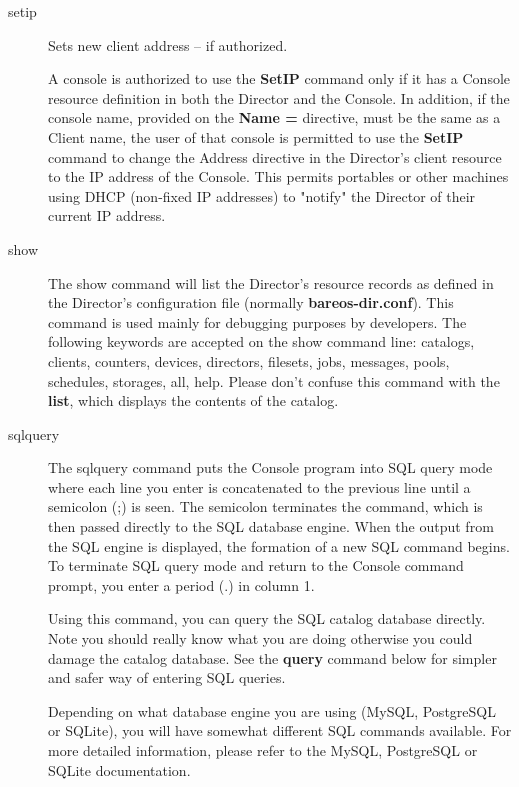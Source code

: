 \begin{description}
\item [setip]
   Sets new client address -- if authorized.

   A console is authorized to use the {\bf SetIP} command only if it has a
   Console resource definition in both the Director and the Console.  In
   addition, if the console name, provided on the {\bf Name =} directive,
   must be the same as a Client name, the user of that console is permitted
   to use the {\bf SetIP} command to change the Address directive in the
   Director's client resource to the IP address of the Console.  This
   permits portables or other machines using DHCP (non-fixed IP addresses)
   to "notify" the Director of their current IP address.



\item [show]
   The show command will list the Director's resource records as defined in
   the Director's configuration file (normally {\bf bareos-dir.conf}).
   This command is used mainly for debugging purposes by developers.
   The following keywords are accepted on the
   show command line: catalogs, clients, counters, devices, directors,
   filesets, jobs, messages, pools, schedules, storages, all, help.
   Please don't confuse this command
   with the {\bf list}, which displays the contents of the catalog.

\item [sqlquery]
   The sqlquery command puts the Console program into SQL query mode where
   each line you enter is concatenated to the previous line until a
   semicolon (;) is seen.  The semicolon terminates the command, which is
   then passed directly to the SQL database engine.  When the output from
   the SQL engine is displayed, the formation of a new SQL command begins.
   To terminate SQL query mode and return to the Console command prompt,
   you enter a period (.) in column 1.

   Using this command, you can query the SQL catalog database directly.
   Note you should really know what you are doing otherwise you could
   damage the catalog database.  See the {\bf query} command below for
   simpler and safer way of entering SQL queries.

   Depending on what database engine you are using (MySQL, PostgreSQL or
   SQLite), you will have somewhat different SQL commands available.  For
   more detailed information, please refer to the MySQL, PostgreSQL or
   SQLite documentation.


\end{description}
